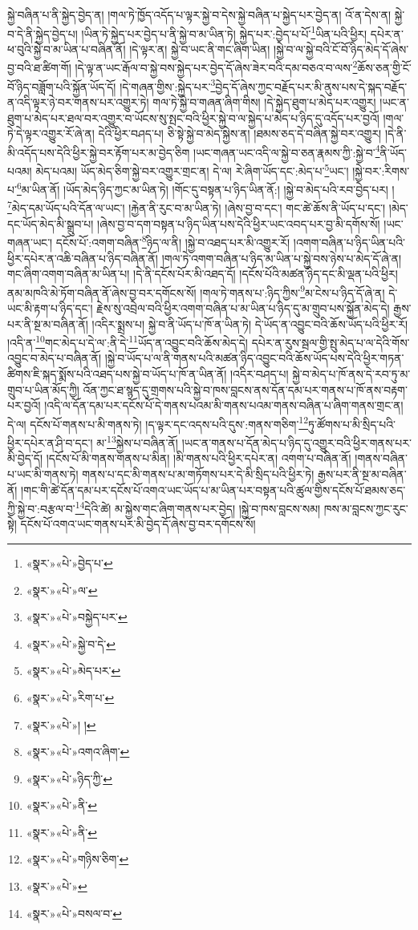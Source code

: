 སྐྱེ་བཞིན་པ་ནི་སྐྱེད་བྱེད་ན། །གལ་ཏེ་ཁྱོད་འདོད་པ་ལྟར་སྐྱེ་བ་དེས་སྐྱེ་བཞིན་པ་སྐྱེད་པར་བྱེད་ན། འོ་ན་དེས་ན། སྐྱེ་བ་དེ་ནི་སྐྱེད་བྱེད་པ། །ཡིན་ཏེ་སྐྱེད་པར་བྱེད་པ་ནི་སྐྱེ་བ་མ་ཡིན་ཏེ། སྐྱེད་པར་:བྱེད་པ་པོ་\footnote{«སྣར་»«པེ་»བྱེད་པ་}ཡིན་པའི་ཕྱིར། དཔེར་ན་ཕ་བུའི་སྐྱེ་བ་མ་ཡིན་པ་བཞིན་ནོ། །དེ་ལྟར་ན། སྐྱེ་བ་ཡང་ནི་གང་ཞིག་ཡིན། །སྐྱེ་བ་ལ་སྐྱེ་བའི་ངོ་བོ་ཉིད་མེད་དོ་ཞེས་བྱ་བའི་ཐ་ཚིག་གོ། །དེ་ལྟ་ན་ཡང་རྒོལ་བ་སྐྱེ་བས་སྐྱེད་པར་བྱེད་དོ་ཞེས་ཟེར་བའི་དམ་བཅའ་བ་ལས་\footnote{«སྣར་»«པེ་»ལ་}ཆོས་ཅན་གྱི་ངོ་བོ་ཉིད་བཟློག་པའི་སྐྱོན་ཡོད་དོ། །དེ་གཞན་གྱིས་:སྐྱེད་པར་\footnote{«སྣར་»«པེ་»བསྐྱེད་པར་}བྱེད་དོ་ཞེས་ཀྱང་བརྗོད་པར་མི་ནུས་པས་དེ་སྐད་བརྗོད་ན་འདི་ལྟར་ཉེ་བར་གནས་པར་འགྱུར་ཏེ། གལ་ཏེ་སྐྱེ་བ་གཞན་ཞིག་གིས། །དེ་སྐྱེད་ཐུག་པ་མེད་པར་འགྱུར། །ཡང་ན་ཐུག་པ་མེད་པར་ཐལ་བར་འགྱུར་བ་ཡོངས་སུ་སྤང་བའི་ཕྱིར་སྐྱེ་བ་ལ་སྐྱེད་པ་མེད་པ་ཉིད་དུ་འདོད་པར་བྱའོ། །གལ་ཏེ་དེ་ལྟར་འགྱུར་རོ་ཞེ་ན། དེའི་ཕྱིར་བཤད་པ། ཅི་སྟེ་སྐྱེ་བ་མེད་སྐྱེས་ན། །ཐམས་ཅད་དེ་བཞིན་སྐྱེ་བར་འགྱུར། །དེ་ནི་མི་འདོད་པས་དེའི་ཕྱིར་སྐྱེ་བར་རྟོག་པར་མ་བྱེད་ཅིག །ཡང་གཞན་ཡང་འདི་ལ་སྐྱེ་བ་ཅན་རྣམས་ཀྱི་:སྐྱེ་བ་\footnote{«སྣར་»«པེ་»སྐྱེ་བ་དེ་}ནི་ཡོད་པའམ། མེད་པའམ། ཡོད་མེད་ཅིག་སྐྱེ་བར་འགྱུར་གྲང་ན། དེ་ལ། རེ་ཞིག་ཡོད་དང་:མེད་པ་\footnote{«སྣར་»«པེ་»མེད་པར་}ཡང་། །སྐྱེ་བར་:རིགས་པ་\footnote{«སྣར་»«པེ་»རིག་པ་}མ་ཡིན་ནོ། །ཡོད་མེད་ཉིད་ཀྱང་མ་ཡིན་ཏེ། །གོང་དུ་བསྟན་པ་ཉིད་ཡིན་ནོ:། །སྐྱེ་བ་མེད་པའི་རབ་བྱེད་པར། །\footnote{«སྣར་»«པེ་»། །}མེད་དམ་ཡོད་པའི་དོན་ལ་ཡང་། །རྐྱེན་ནི་རུང་བ་མ་ཡིན་ཏེ། །ཞེས་བྱ་བ་དང་། གང་ཚེ་ཆོས་ནི་ཡོད་པ་དང་། །མེད་དང་ཡོད་མེད་མི་སྒྲུབ་པ། །ཞེས་བྱ་བ་དག་བསྟན་པ་ཉིད་ཡིན་པས་དེའི་ཕྱིར་ཡང་འབད་པར་བྱ་མི་དགོས་སོ། །ཡང་གཞན་ཡང་། དངོས་པོ་:འགག་བཞིན་\footnote{«སྣར་»«པེ་»འགའ་ཞིག་}ཉིད་ལ་ནི། །སྐྱེ་བ་འཐད་པར་མི་འགྱུར་རོ། །འགག་བཞིན་པ་ཉིད་ཡིན་པའི་ཕྱིར་དཔེར་ན་འཆི་བཞིན་པ་ཉིད་བཞིན་ནོ། །གལ་ཏེ་འགག་བཞིན་པ་ཉིད་མ་ཡིན་པ་སྐྱེ་བས་ཉེས་པ་མེད་དོ་ཞེ་ན། གང་ཞིག་འགག་བཞིན་མ་ཡིན་པ། །དེ་ནི་དངོས་པོར་མི་འཐད་དོ། །དངོས་པོའི་མཚན་ཉིད་དང་མི་ལྡན་པའི་ཕྱིར། ནམ་མཁའི་མེ་ཏོག་བཞིན་ནོ་ཞེས་བྱ་བར་དགོངས་སོ། །གལ་ཏེ་གནས་པ་:ཉིད་ཀྱིས་\footnote{«སྣར་»«པེ་»ཉིད་ཀྱི་}མ་ངེས་པ་ཉིད་དོ་ཞེ་ན། དེ་ཡང་མི་རྟག་པ་ཉིད་དང་། རྗེས་སུ་འབྲེལ་བའི་ཕྱིར་འགག་བཞིན་པ་མ་ཡིན་པ་ཉིད་དུ་མ་གྲུབ་པས་སྐྱོན་མེད་དེ། རྒྱས་པར་ནི་སྔ་མ་བཞིན་ནོ། །འདིར་སྨྲས་པ། སྐྱེ་བ་ནི་ཡོད་པ་ཁོ་ན་ཡིན་ཏེ། དེ་ཡོད་ན་འབྱུང་བའི་ཆོས་ཡོད་པའི་ཕྱིར་རོ། །འདི་ན་\footnote{«སྣར་»«པེ་»ནི་}གང་མེད་པ་དེ་ལ་:ནི་དེ་\footnote{«སྣར་»«པེ་»ནི་}ཡོད་ན་འབྱུང་བའི་ཆོས་མེད་དེ། དཔེར་ན་རུས་སྦལ་གྱི་སྤུ་མེད་པ་ལ་དེའི་གོས་འབྱུང་བ་མེད་པ་བཞིན་ནོ། །སྐྱེ་བ་ཡོད་པ་ལ་ནི་གནས་པའི་མཚན་ཉིད་འབྱུང་བའི་ཆོས་ཡོད་པས་དེའི་ཕྱིར་གཏན་ཚིགས་ཇི་སྐད་སྨོས་པའི་འཐད་པས་སྐྱེ་བ་ཡོད་པ་ཁོ་ན་ཡིན་ནོ། །འདིར་བཤད་པ། སྐྱེ་བ་མེད་པ་ཁོ་ནས་དེ་རབ་ཏུ་མ་གྲུབ་པ་ཡིན་མོད་ཀྱི། འོན་ཀྱང་ཐ་སྙད་དུ་གྲགས་པའི་སྐྱེ་བ་ཁས་བླངས་ནས་དོན་དམ་པར་གནས་པ་ཁོ་ནས་བརྟག་པར་བྱའོ། །འདི་ལ་དོན་དམ་པར་དངོས་པོ་དེ་གནས་པའམ་མི་གནས་པའམ་གནས་བཞིན་པ་ཞིག་གནས་གྲང་ན། དེ་ལ། དངོས་པོ་གནས་པ་མི་གནས་ཏེ། །ད་ལྟར་དང་འདས་པའི་དུས་:གནས་གཅིག་\footnote{«སྣར་»«པེ་»གཉིས་ཅིག་}ཏུ་ཚོགས་པ་མི་སྲིད་པའི་ཕྱིར་དཔེར་ན་ཤི་བ་དང་། མ་\footnote{«སྣར་»«པེ་»}སྐྱེས་པ་བཞིན་ནོ། །ཡང་ན་གནས་པ་དོན་མེད་པ་ཉིད་དུ་འགྱུར་བའི་ཕྱིར་གནས་པར་མི་བྱེད་དོ། །དངོས་པོ་མི་གནས་གནས་པ་མིན། །མི་གནས་པའི་ཕྱིར་དཔེར་ན། འགག་པ་བཞིན་ནོ། །གནས་བཞིན་པ་ཡང་མི་གནས་ཏེ། གནས་པ་དང་མི་གནས་པ་མ་གཏོགས་པར་དེ་མི་སྲིད་པའི་ཕྱིར་ཏེ། རྒྱས་པར་ནི་སྔ་མ་བཞིན་ནོ། །གང་གི་ཚེ་དོན་དམ་པར་དངོས་པོ་འགའ་ཡང་ཡོད་པ་མ་ཡིན་པར་བསྟན་པའི་ཚུལ་གྱིས་དངོས་པོ་ཐམས་ཅད་ཀྱི་སྐྱེ་བ་:བརྩལ་བ་\footnote{«སྣར་»«པེ་»བསལ་བ་}དེའི་ཚེ། མ་སྐྱེས་གང་ཞིག་གནས་པར་བྱེད། །སྐྱེ་བ་ཁས་བླངས་སམ། ཁས་མ་བླངས་ཀྱང་རུང་སྟེ། དངོས་པོ་འགའ་ཡང་གནས་པར་མི་བྱེད་དོ་ཞེས་བྱ་བར་དགོངས་སོ། 